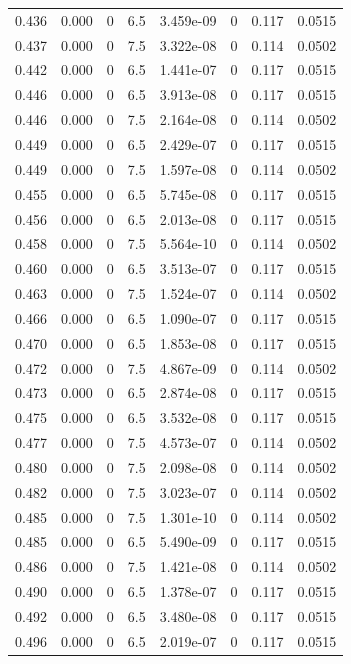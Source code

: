 \documentclass[preview]{standalone}
\begin{document}
{{{{{{\begin{tabular}{L{1.2cm}C{1.2cm} C{0.3cm}C{0.5cm} C{1.4cm}C{1.4cm} C{1.4cm}C{1.4cm}}
  0.436  &  0.000  & 0     & 6.5 &  3.459e-09  & 0  & 0.117 &  0.0515   \\ 
  0.437  &  0.000  & 0     & 7.5 &  3.322e-08  & 0  & 0.114 &  0.0502   \\ 
  0.442  &  0.000  & 0     & 6.5 &  1.441e-07  & 0  & 0.117 &  0.0515   \\ 
  0.446  &  0.000  & 0     & 6.5 &  3.913e-08  & 0  & 0.117 &  0.0515   \\ 
  0.446  &  0.000  & 0     & 7.5 &  2.164e-08  & 0  & 0.114 &  0.0502   \\ 
  0.449  &  0.000  & 0     & 6.5 &  2.429e-07  & 0  & 0.117 &  0.0515   \\ 
  0.449  &  0.000  & 0     & 7.5 &  1.597e-08  & 0  & 0.114 &  0.0502   \\ 
  0.455  &  0.000  & 0     & 6.5 &  5.745e-08  & 0  & 0.117 &  0.0515   \\ 
  0.456  &  0.000  & 0     & 6.5 &  2.013e-08  & 0  & 0.117 &  0.0515   \\ 
  0.458  &  0.000  & 0     & 7.5 &  5.564e-10  & 0  & 0.114 &  0.0502   \\ 
  0.460  &  0.000  & 0     & 6.5 &  3.513e-07  & 0  & 0.117 &  0.0515   \\ 
  0.463  &  0.000  & 0     & 7.5 &  1.524e-07  & 0  & 0.114 &  0.0502   \\ 
  0.466  &  0.000  & 0     & 6.5 &  1.090e-07  & 0  & 0.117 &  0.0515   \\ 
  0.470  &  0.000  & 0     & 6.5 &  1.853e-08  & 0  & 0.117 &  0.0515   \\ 
  0.472  &  0.000  & 0     & 7.5 &  4.867e-09  & 0  & 0.114 &  0.0502   \\ 
  0.473  &  0.000  & 0     & 6.5 &  2.874e-08  & 0  & 0.117 &  0.0515   \\ 
  0.475  &  0.000  & 0     & 6.5 &  3.532e-08  & 0  & 0.117 &  0.0515   \\ 
  0.477  &  0.000  & 0     & 7.5 &  4.573e-07  & 0  & 0.114 &  0.0502   \\ 
  0.480  &  0.000  & 0     & 7.5 &  2.098e-08  & 0  & 0.114 &  0.0502   \\ 
  0.482  &  0.000  & 0     & 7.5 &  3.023e-07  & 0  & 0.114 &  0.0502   \\ 
  0.485  &  0.000  & 0     & 7.5 &  1.301e-10  & 0  & 0.114 &  0.0502   \\ 
  0.485  &  0.000  & 0     & 6.5 &  5.490e-09  & 0  & 0.117 &  0.0515   \\ 
  0.486  &  0.000  & 0     & 7.5 &  1.421e-08  & 0  & 0.114 &  0.0502   \\ 
  0.490  &  0.000  & 0     & 6.5 &  1.378e-07  & 0  & 0.117 &  0.0515   \\ 
  0.492  &  0.000  & 0     & 6.5 &  3.480e-08  & 0  & 0.117 &  0.0515   \\ 
  0.496  &  0.000  & 0     & 6.5 &  2.019e-07  & 0  & 0.117 &  0.0515   \\ 
\hline 
\end{tabular} 

}}}}}}
\end{document}
